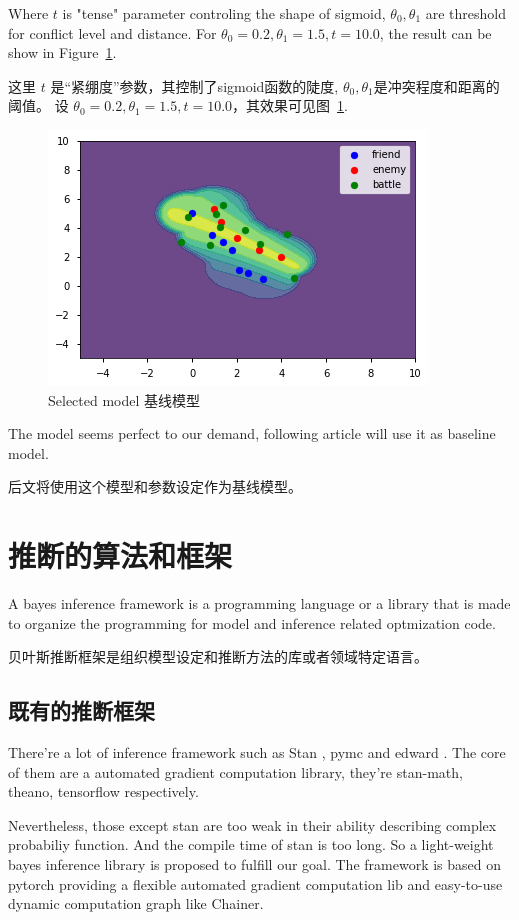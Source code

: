 \documentclass{article}
\begin{document}
Where $t$ is "tense" parameter controling the shape of sigmoid, $\theta_0,\theta_1$ are threshold for
conflict level and distance. For $\theta_0=0.2,\theta_1=1.5,t = 10.0$, the result can be show in Figure~\ref{fig:combSix}.

这里 $t$ 是“紧绷度”参数，其控制了sigmoid函数的陡度, $\theta_0,\theta_1$是冲突程度和距离的阈值。
 设 $\theta_0=0.2,\theta_1=1.5,t = 10.0$，其效果可见图~\ref{fig:combSix}.


\begin{figure}[ht]
\includegraphics[width=0.6\linewidth]{comb6.png}
\caption{Selected model 基线模型}
\label{fig:combSix}
\end{figure}

The model seems perfect to our demand, following article will use it as baseline model.

后文将使用这个模型和参数设定作为基线模型。

\section{推断的算法和框架}

A bayes inference framework is a programming language or a library that is made to organize the 
programming for model and inference related optmization code.

贝叶斯推断框架是组织模型设定和推断方法的库或者领域特定语言。

\subsection{既有的推断框架}

There're a lot of inference framework such as Stan \cite{carpenter2017stan}, 
pymc\cite{patil2010pymc} and edward \cite{tran2016edward}. 
The core of them are a automated gradient computation library, 
they're stan-math, theano, tensorflow respectively. 

Nevertheless, those except stan are too weak in their ability describing complex probabiliy function.
And the compile time of stan is too long. 
So a light-weight bayes inference library is proposed to fulfill our goal. 
The framework is based on pytorch providing a flexible automated gradient computation lib and 
easy-to-use dynamic computation graph like Chainer.
\end{document}
